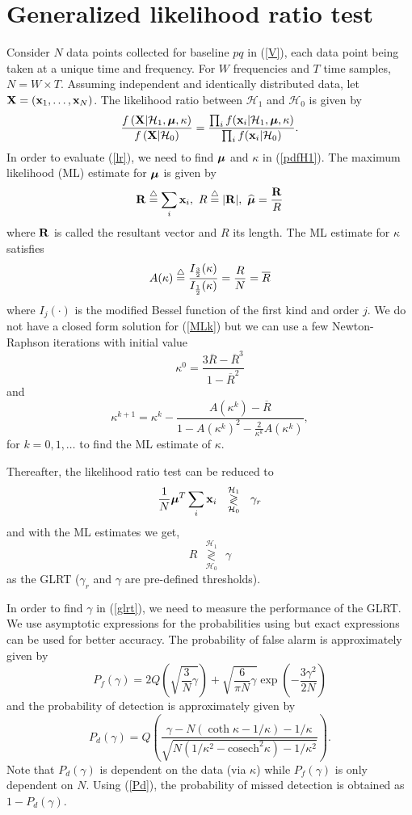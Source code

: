 \documentclass[conference]{IEEEtran}
\newcommand{\beq}{\begin{equation}}
\newcommand{\eeq}{\end{equation}}
\def\bmath#1{\mbox{\boldmath$#1$}}
\begin{document}
\section{Generalized likelihood ratio test}\label{sec:glrt}
Consider $N$ data points collected for baseline $pq$ in (\ref{V}), each data point being taken at a unique time and frequency. For $W$ frequencies and $T$ time samples, $N=W\times T$. Assuming independent and identically distributed data, let ${\bf X}=({\bf x}_1,\ldots,{\bf x}_N)$. The likelihood ratio between $\mathcal{H}_1$ and $\mathcal{H}_0$ is given by
\beq \label{lr}
\frac{f\left({\bf X}{\mid}\mathcal{H}_1,{\bmath \mu},\kappa \right)}{f\left({\bf X}{\mid}\mathcal{H}_0\right)} = \frac{\prod_i f({\bf x}_i {\mid} \mathcal{H}_1, {\bmath \mu},\kappa)}{\prod_i f({\bf x}_i {\mid} \mathcal{H}_0)}.
\eeq
In order to evaluate (\ref{lr}), we need to find ${\bmath \mu}$ and $\kappa$ in (\ref{pdfH1}). The maximum likelihood (ML) estimate for ${\bmath \mu}$ is given by
\beq \label{MLmu}
 {\bf R}\buildrel\triangle\over=\sum_i {\bf x}_i,\ R\buildrel\triangle\over=|{\bf R}|,\ \widehat{\bmath \mu}=\frac{\bf R}{R}
\eeq
where ${\bf R}$ is called the resultant vector and $R$ its length. The ML estimate for $\kappa$ satisfies
\beq \label{MLk}
 A(\kappa)\buildrel \triangle\over=\frac{I_{\frac{3}{2}}(\kappa)}{I_{\frac{1}{2}}(\kappa)} = \frac{ R}{N} = \overline{R}
\eeq
where $I_{j}(\cdot)$ is the modified Bessel function of the first kind and order $j$.
We do not have a closed form solution for (\ref{MLk}) but we can use a few Newton-Raphson iterations  \cite{dhillon2003} with initial value 
\beq
\kappa^0=\frac{3\overline{R}-\overline{R}^3}{1-\overline{R}^2}
\eeq
and
\beq
 \kappa^{k+1}=\kappa^{k}-\frac{A(\kappa^k)-\overline{R}}{1-A(\kappa^k)^2-\frac{2}{\kappa^k} A(\kappa^k)},
\eeq
for $k=0,1,\ldots$ to find the ML estimate of $\kappa$.

Thereafter, the likelihood ratio test can be reduced to
\beq \label{lrt}
\frac{1}{N} {\bmath \mu}^T \sum_i {\bf x}_i\ \  \underset{\mathcal{H}_0}{\overset{\mathcal{H}_1}{\gtrless}}\ \ \gamma_r
\eeq
and with the ML estimates we get,
\beq \label{glrt}
R\ \  \underset{\mathcal{H}_0}{\overset{\mathcal{H}_1}{\gtrless}}\ \  \gamma
\eeq
as the GLRT ($\gamma_r$ and $\gamma$ are pre-defined thresholds).

In order to find $\gamma$ in (\ref{glrt}), we need to measure the performance of the GLRT. We use asymptotic expressions for the probabilities using \cite{Guo2013} but exact expressions \cite{Fisher1953,Stephens1967} can be used for better accuracy.
The probability of false alarm is approximately given by
\beq \label{Pf}
P_f(\gamma)=2 Q\left(\sqrt{\frac{3}{N}\gamma}\right)+ \sqrt{\frac{6}{\pi N}\gamma}\exp\left(-\frac{3\gamma^2}{2N}\right)
\eeq
and the probability of detection is approximately given by
\beq \label{Pd}
P_d(\gamma)=Q\left(\frac{\gamma-N(\coth \kappa - 1/\kappa)-1/\kappa}{\sqrt{N(1/\kappa^2-{\mathrm{cosech}}^2 \kappa)-1/\kappa^2}}\right).
\eeq
Note that $P_d(\gamma)$ is dependent on the data (via $\kappa$) while $P_f(\gamma)$ is only dependent on $N$. Using (\ref{Pd}), the probability of missed detection is obtained as $1-P_d(\gamma)$.
\end{document}
